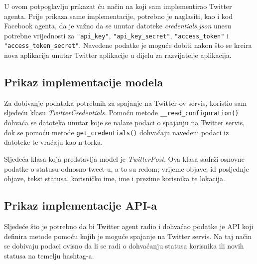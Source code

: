 \documentclass[a4paper,12pt]{foi}
\begin{document}
U ovom potpoglavlju prikazat ću način na koji sam implementirao Twitter agenta. Prije prikaza same implementacije, potrebno je naglasiti, kao i kod Facebook agenta, da je važno da se unutar datoteke \textit{credentials.json} unesu potrebne vrijednosti za \texttt{"api\_key"}, \texttt{"api\_key\_secret"}, \texttt{"access\_token"} i \texttt{"access\_token\_secret"}. Navedene podatke je moguće dobiti nakon što se kreira nova aplikacija unutar Twitter aplikacije u dijelu za razvijatelje aplikacija.

\subsection{Prikaz implementacije modela}

Za dobivanje podataka potrebnih za spajanje na Twitter-ov servis, koristio sam sljedeću klasu \textit{TwitterCredentials}. Pomoću metode \texttt{\_\_read\_configuration()} dohvaća se datoteka unutar koje se nalaze podaci o spajanju na Twitter servis, dok se pomoću metode \texttt{get\_credentials()} dohvaćaju navedeni podaci iz datoteke te vraćaju kao n-torka.

\lstset{commentstyle=\textit,language=python}


Sljedeća klasa koja predstavlja model je \textit{TwitterPost}. Ova klasa sadrži osnovne podatke o statusu odnosno tweet-u, a to su redom; vrijeme objave, id posljednje objave, tekst statusa, korisničko ime, ime i prezime korisnika te lokacija.

\lstset{commentstyle=\textit,language=python}


\subsection{Prikaz implementacije API-a}

Sljedeće što je potrebno da bi Twitter agent radio i dohvaćao podatke je API koji definira metode pomoću kojih je moguće spajanje na Twitter servis. Na taj način se dobivaju podaci ovisno da li se radi o dohvaćanju statusa korisnika ili novih statusa na temelju hashtag-a.
\end{document}

